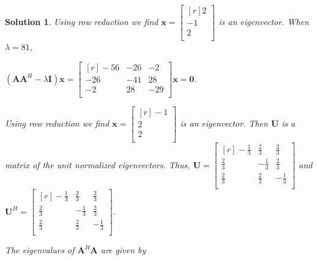 \documentclass{article}
\newtheorem*{solution}{Solution}
\begin{document}
\begin{solution}
    Using row reduction we find $\mathbf{x} =     
    \begin{bmatrix*}[r]
        2 \\
        -1 \\
        2 \\
    \end{bmatrix*}$ is an eigenvector. When $\lambda = 81$,
    
    \begin{center}
        \begin{math}
            (\mathbf{A}\mathbf{A}^{H} - \lambda\mathbf{I})\mathbf{x} = 
                \begin{bmatrix*}[r]
                    -56 & -26 & -2 \\
                    -26 & -41 & 28 \\
                    -2 & 28 & -29 \\ 
                \end{bmatrix*} \mathbf{x}
                =\mathbf{0}.
        \end{math}
    \end{center}

    Using row reduction we find $\mathbf{x} =     
    \begin{bmatrix*}[r]
        -1 \\
        2 \\
        2 \\
    \end{bmatrix*}$ is an eigenvector. Then $\mathbf{U}$ is a matrix of
    the unit normalized eigenvectors. Thus, $\mathbf{U} =
    \begin{bmatrix*}[r]
        -\frac{1}{3} & \frac{2}{3} & \frac{2}{3} \\
        \frac{2}{3} & -\frac{1}{3} & \frac{2}{3} \\
        \frac{2}{3} & \frac{2}{3} & -\frac{1}{3} \\
    \end{bmatrix*}$ and $\mathbf{U}^{H} =     
    \begin{bmatrix*}[r]
        -\frac{1}{3} & \frac{2}{3} & \frac{2}{3} \\
        \frac{2}{3} & -\frac{1}{3} & \frac{2}{3} \\
        \frac{2}{3} & \frac{2}{3} & -\frac{1}{3} \\
    \end{bmatrix*}$.

    \bigskip

    The eigenvalues of $\mathbf{A}^{H}\mathbf{A}$ are given by


\end{solution}
\end{document}

